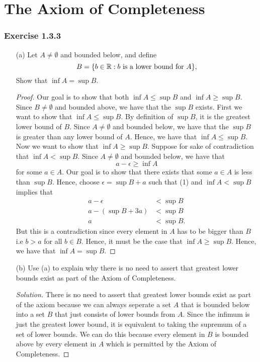
\section{The Axiom of Completeness}




\subsubsection{Exercise 1.3.3} \begin{enumerate} \item[(a)] Let \( A \neq \emptyset \) and bounded below, and define \[ B = \{ b \in \mathbb{R} : b \text{ is a lower bound for   } A  \},\] Show that \( \inf A = \sup B \). \begin{proof} Our goal is to show that both \( \inf A \leq \sup B \) and \( \inf A \geq \sup B \). Since \( B \neq \emptyset\) and bounded above, we have that the \( \sup B \) exists. First we want to show that \( \inf A \leq \sup B \). By definition of \( \sup B \), it is the greatest lower bound of \( B \). Since \( A \neq \emptyset \) and bounded below, we have that the \( \sup B \) is greater than any lower bound of \( A \). Hence, we have that \( \inf A \leq \sup B \). Now we want to show that \( \inf A \geq \sup B \). Suppose for sake of contradiction that \( \inf A < \sup B \). Since \( A \neq \emptyset\) and bounded below, we have that \[ a - \epsilon \geq \inf A \tag{1}\] for some \( a \in A \). Our goal is to show that there exists that some \( a \in A \) is less than \( \sup B \). Hence, choose \( \epsilon = \sup B + a \) such that (1) and \( \inf A < \sup B \) implies that \begin{align*} a - \epsilon &< \sup B \\ a - (\sup B + 3a) &< \sup B \\ a &< \sup B. \end{align*}  But this is a contradiction since every element in \(A  \) has to be bigger than \( B \) i.e \( b > a \) for all \( b \in B \). Hence, it must be the case that \(\inf A \geq \sup B  \). Hence, we have that \( \inf A = \sup B \). \end{proof} \item[(b)] Use (a) to explain why there is no need to assert that greatest lower bounds exist as part of the Axiom of Completeness. \begin{proof}[Solution] There is no need to assert that greatest lower bounds exist as part of the axiom because we can always seperate a set \( A \) that is bounded below into a set \( B \) that just consists of lower bounds from \( A \). Since the infimum is just the greatest lower bound, it is equivalent to taking the supremum of a set of lower bounds. We can do this because every element in \( B \) is bounded above by every element in \( A \) which is permitted by the Axiom of Completeness.  \end{proof}
\end{enumerate}

